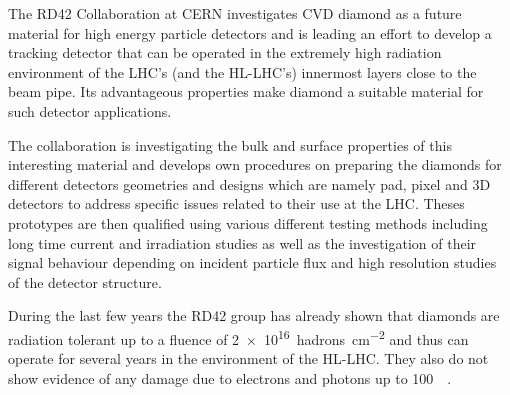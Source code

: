 
The RD42 Collaboration at CERN investigates \ac{CVD} diamond as a future material for high energy particle detectors and is leading an effort to develop a tracking detector that can be operated in the extremely high radiation environment of the LHC's (and the HL-LHC's) innermost layers close to the beam pipe. Its advantageous properties make diamond a suitable material for such detector applications.\par
The collaboration is investigating the bulk and surface properties of this interesting material and develops own procedures on preparing the diamonds for different detectors geometries and designs which are namely pad, pixel and 3D detectors to address specific issues related to their use at the LHC. Theses prototypes are then qualified using various different testing methods including long time current and irradiation studies as well as the investigation of their signal behaviour depending on incident particle flux and high resolution studies of the detector structure.\par
During the last few years the RD42 group has already shown that diamonds are radiation tolerant up to a fluence of \SI{2e16}{hadrons\per\centi\meter^2} and thus can operate for several years in the environment of the HL-LHC. They also do not show evidence of any damage due to electrons and photons up to \SI{100}{\mega\rad}.\parend